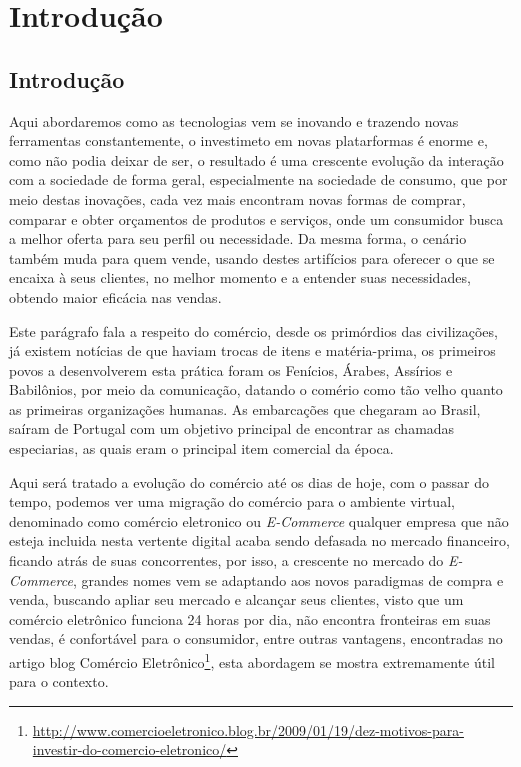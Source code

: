 \part{Introdução}
\chapter{Introdução}


Aqui abordaremos como as tecnologias vem se inovando e trazendo novas ferramentas constantemente, o investimeto em novas platarformas é enorme e, como não podia deixar de ser, o resultado é uma crescente evolução da interação com a sociedade de forma geral, especialmente na sociedade de consumo, que por meio destas inovações, cada vez mais encontram novas formas de comprar, comparar e obter orçamentos de produtos e serviços, onde um consumidor busca a melhor oferta para seu perfil ou necessidade. Da mesma forma, o cenário também muda para quem vende, usando destes artifícios para oferecer o que se encaixa à seus clientes, no melhor momento e a entender suas necessidades, obtendo maior eficácia nas vendas.

Este parágrafo fala a respeito do comércio, desde os primórdios das civilizações, já existem notícias de que haviam trocas de itens e matéria-prima, os primeiros povos a desenvolverem esta prática foram os Fenícios, Árabes, Assírios e Babilônios, por meio da comunicação, datando o comério como tão velho quanto as primeiras organizações humanas. As embarcações que chegaram ao Brasil, saíram de Portugal com um objetivo principal de encontrar as chamadas especiarias, as quais eram o principal item comercial da época\cite{furtado:2009}.

Aqui será tratado a evolução do comércio até os dias de hoje, com o passar do tempo, podemos ver uma migração do comércio para o ambiente virtual, denominado como comércio eletronico ou \textit{E-Commerce} qualquer empresa que não esteja incluida nesta vertente digital acaba sendo defasada no mercado financeiro, ficando atrás de suas concorrentes\cite{roque:2012}, por isso, a crescente no mercado do \textit{E-Commerce}, grandes nomes vem se adaptando aos novos paradigmas de compra e venda, buscando apliar seu mercado e alcançar seus clientes, visto que um comércio eletrônico funciona 24 horas por dia, não encontra fronteiras em suas vendas, é confortável para o consumidor, entre outras vantagens, encontradas no artigo blog Comércio Eletrônico\footnote{\url{http://www.comercioeletronico.blog.br/2009/01/19/dez-motivos-para-investir-do-comercio-eletronico/}}, esta abordagem se mostra extremamente útil para o contexto.

